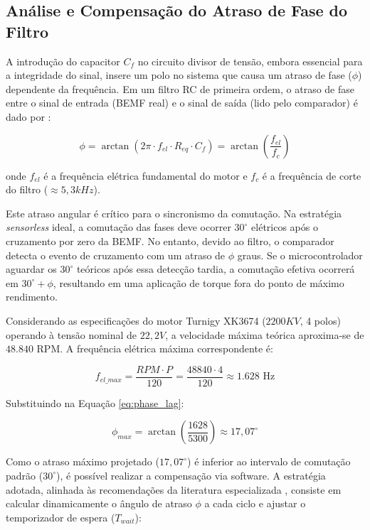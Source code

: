 \subsection{Análise e Compensação do Atraso de Fase do Filtro}

A introdução do capacitor $C_f$ no circuito divisor de tensão, embora essencial para a integridade do sinal, insere um polo no sistema que causa um atraso de fase ($\phi$) dependente da frequência. Em um filtro RC de primeira ordem, o atraso de fase entre o sinal de entrada (BEMF real) e o sinal de saída (lido pelo comparador) é dado por \cite{ti2013sensorless}:

\begin{equation}
    \phi = \arctan(2\pi \cdot f_{el} \cdot R_{eq} \cdot C_f) = \arctan\left(\frac{f_{el}}{f_c}\right)
    \label{eq:phase_lag}
\end{equation}

\noindent onde $f_{el}$ é a frequência elétrica fundamental do motor e $f_c$ é a frequência de corte do filtro ($\approx 5,3kHz$).

Este atraso angular é crítico para o sincronismo da comutação. Na estratégia \textit{sensorless} ideal, a comutação das fases deve ocorrer $30^{\circ}$ elétricos após o cruzamento por zero da BEMF. No entanto, devido ao filtro, o comparador detecta o evento de cruzamento com um atraso de $\phi$ graus. Se o microcontrolador aguardar os $30^{\circ}$ teóricos após essa detecção tardia, a comutação efetiva ocorrerá em $30^{\circ} + \phi$, resultando em uma aplicação de torque fora do ponto de máximo rendimento.

Considerando as especificações do motor Turnigy XK3674 ($2200KV$, 4 polos) operando à tensão nominal de $22,2V$, a velocidade máxima teórica aproxima-se de $48.840$ RPM. A frequência elétrica máxima correspondente é:

\begin{equation}
    f_{el\_max} = \frac{RPM \cdot P}{120} = \frac{48840 \cdot 4}{120} \approx 1.628 \text{ Hz}
\end{equation}

Substituindo na Equação \ref{eq:phase_lag}:

\begin{equation}
    \phi_{max} = \arctan\left(\frac{1628}{5300}\right) \approx 17,07^{\circ}
\end{equation}

Como o atraso máximo projetado ($17,07^{\circ}$) é inferior ao intervalo de comutação padrão ($30^{\circ}$), é possível realizar a compensação via software. A estratégia adotada, alinhada às recomendações da literatura especializada \cite{ti2013sensorless}, consiste em calcular dinamicamente o ângulo de atraso $\phi$ a cada ciclo e ajustar o temporizador de espera ($T_{wait}$):

